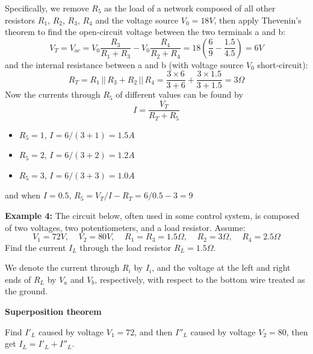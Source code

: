 \documentclass{article}
\begin{document}
\begin{itemize}
Specifically, we remove $R_5$ as the load of a network composed of all other
resistors $R_1$, $R_2$, $R_3$, $R_4$ and the voltage source $V_0=18V$, then
apply Thevenin's theorem to find the open-circuit voltage between the two
terminals a and b:
\begin{equation}	
  V_T=V_{oc}=V_0\frac{R_3}{R_1+R_3}-V_0\frac{R_4}{R_2+R_4}
  =18 \left(\frac{6}{9}-\frac{1.5}{4.5}\right)=6V 
\end{equation}
and the internal resistance between a and b (with voltage source $V_0$ 
short-circuit):
\begin{equation} 
  R_T=R_1\,||\,R_3+R_2\,||\,R_4
  =\frac{3\times 6}{3+6}+\frac{3\times 1.5}{3+1.5}=3\Omega 
\end{equation}
Now the currents through $R_5$ of different values can be found by
\begin{equation}
  I=\frac{V_T}{R_T+R_5}
\end{equation}

\begin{itemize}
\item $R_5=1$, $I=6/(3+1)=1.5A$
\item $R_5=2$, $I=6/(3+2)=1.2A$
\item $R_5=3$, $I=6/(3+3)=1.0A$
\end{itemize}
and when $I=0.5$, $R_5=V_T/I-R_T=6/0.5-3=9$
\end{itemize}

{\bf Example 4: } The circuit below, often used in some control system, 
is composed of two voltages, two potentiometers, and a load resistor.
Assume:
\begin{equation}
  V_1=72V,\;\;\;\;V_2=80V,\;\;\;\;R_1=R_3=1.5\Omega,\;\;\;\;R_2=3\Omega,
  \;\;\;\;R_4=2.5\Omega
\end{equation}
Find the current $I_L$ through the load resistor $R_L=1.5\Omega$. 

We denote the current through $R_i$ by $I_i$, and the voltage at the left 
and right ends of $R_L$ by $V_a$ and $V_b$, respectively, with respect to 
the bottom wire treated as the ground.


{\bf Superposition theorem}

Find $I'_L$ caused by voltage $V_1=72$, and then $I''_L$ caused by voltage
$V_2=80$, then get $I_L=I'_L+I''_L$.
\end{document}
